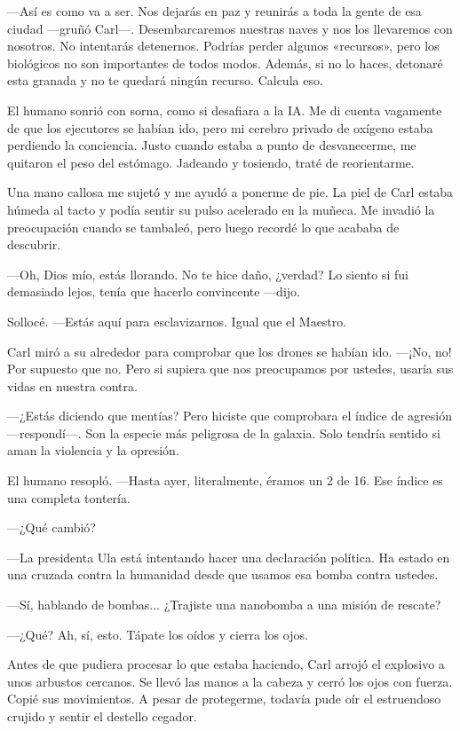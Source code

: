 —Así es como va a ser. Nos dejarás en paz y reunirás a toda la gente de esa ciudad —gruñó Carl—. Desembarcaremos nuestras naves y nos los llevaremos con nosotros. No intentarás detenernos. Podrías perder algunos «recursos», pero los biológicos no son importantes de todos modos. Además, si no lo haces, detonaré esta granada y no te quedará ningún recurso. Calcula eso.

El humano sonrió con sorna, como si desafiara a la IA. Me di cuenta vagamente de que los ejecutores se habían ido, pero mi cerebro privado de oxígeno estaba perdiendo la conciencia. Justo cuando estaba a punto de desvanecerme, me quitaron el peso del estómago. Jadeando y tosiendo, traté de reorientarme.

Una mano callosa me sujetó y me ayudó a ponerme de pie. La piel de Carl estaba húmeda al tacto y podía sentir su pulso acelerado en la muñeca. Me invadió la preocupación cuando se tambaleó, pero luego recordé lo que acababa de descubrir.

—Oh, Dios mío, estás llorando. No te hice daño, ¿verdad? Lo siento si fui demasiado lejos, tenía que hacerlo convincente —dijo.

Sollocé. —Estás aquí para esclavizarnos. Igual que el Maestro.

Carl miró a su alrededor para comprobar que los drones se habían ido. —¡No, no! Por supuesto que no. Pero si supiera que nos preocupamos por ustedes, usaría sus vidas en nuestra contra.

—¿Estás diciendo que mentías? Pero hiciste que comprobara el índice de agresión —respondí—. Son la especie más peligrosa de la galaxia. Solo tendría sentido si aman la violencia y la opresión.

El humano resopló. —Hasta ayer, literalmente, éramos un 2 de 16. Ese índice es una completa tontería.

 —¿Qué cambió?

—La presidenta Ula está intentando hacer una declaración política. Ha estado en una cruzada contra la humanidad desde que usamos esa bomba contra ustedes.

—Sí, hablando de bombas... ¿Trajiste una nanobomba a una misión de rescate?

 —¿Qué? Ah, sí, esto. Tápate los oídos y cierra los ojos.

Antes de que pudiera procesar lo que estaba haciendo, Carl arrojó el explosivo a unos arbustos cercanos. Se llevó las manos a la cabeza y cerró los ojos con fuerza. Copié sus movimientos. A pesar de protegerme, todavía pude oír el estruendoso crujido y sentir el destello cegador.

